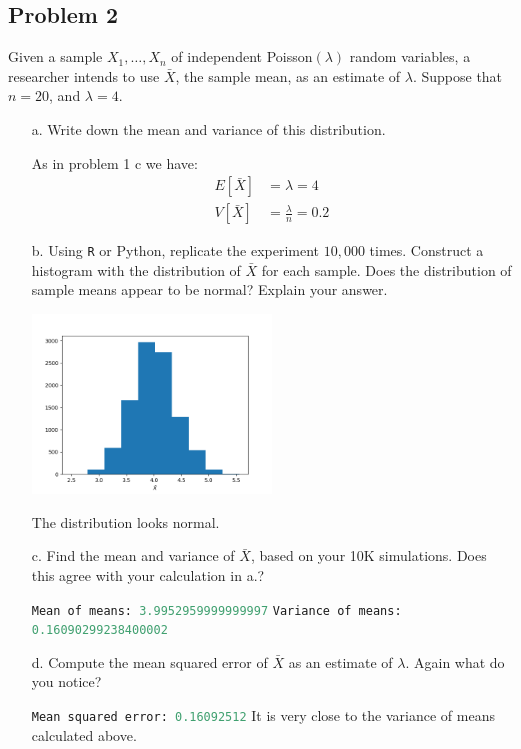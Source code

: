 \documentclass{article}
\newcommand{\1}{\mathbf{1}}
\begin{document}
\newpage
\subsection*{Problem 2}
Given a sample $X_1,\ldots , X_n$  of independent Poisson$(\lambda)$ random variables, a researcher  intends to use $\bar{X}$, the sample mean, as an estimate of $\lambda$.  Suppose that $n=20$, and $\lambda=4$.
\begin{itemize}
    \item[a.] Write down the mean and variance of this distribution.
    
    As in problem 1 c we have:
    \begin{align*}
        E[\bar X] &= \lambda = 4 \\
        V[\bar X] &= \frac{\lambda}{n} = 0.2
    \end{align*}
    
    \item[b.] Using {\tt R} or Python, replicate the experiment $10,000$ times. Construct a histogram with the distribution of $\bar{X}$ for each sample. Does the distribution of sample means appear to be normal? Explain your answer.
    
    \begin{center}
        \includegraphics[width=0.5\textwidth]{STATS509/HW7/HW7Figures/Problem2.png}
    \end{center}
    
    The distribution looks normal. 
    
    
    \item[c.] Find the mean and variance of $\bar{X}$, based on your 10K simulations. Does this agree with your calculation in a.?
    
    \lstinline[language=Python]{Mean of means: 3.9952959999999997}\newline
    \lstinline[language=Python]{Variance of means: 0.16090299238400002}
    
    \item[d.] Compute the mean squared error of $\bar{X}$ as an estimate of $\lambda$. Again what do you notice? 
    
    \lstinline[language=Python]{Mean squared error: 0.16092512} \newline
    It is very close to the variance of means calculated above. 
\end{itemize}
\end{document}
